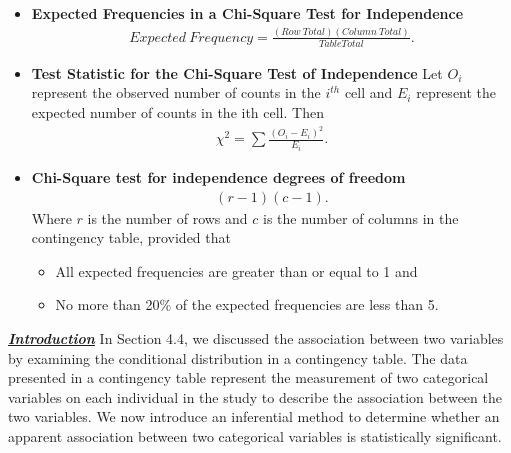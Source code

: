 \documentclass{report}
\begin{document}
    \begin{itemize}
        \item \textbf{Expected Frequencies in a Chi-Square Test for Independence}
            \begin{align*}
                Expected\ Frequency = \frac{(Row\ Total)(Column\ Total)}{Table Total} 
            .\end{align*}
        \item \textbf{Test Statistic for the Chi-Square Test of Independence}
            Let $O_{i}$ represent the observed number of counts in the $i^{th}$ cell and $E_{i}$ represent the expected number of counts in the ith cell. Then
            \begin{align*}
                \chi^{2} = \sum \frac{(O_{i} - E_{i})^{2}}{E_{i}}
            .\end{align*}
        \item \textbf{Chi-Square test for independence degrees of freedom}
            \begin{align*}
                (r-1)(c-1)
            .\end{align*}
             Where $r $ is the number of rows and $c $ is the number of columns in the contingency table, provided that
             \begin{itemize}
                 \item All expected frequencies are greater than or equal to 1 and
                 \item No more than 20\% of the expected frequencies are less than 5.
             \end{itemize}
    \end{itemize}
    \pagebreak \bigbreak \noindent 
    \textbf{\textit{\underline{Introduction}}}
    \bigbreak \noindent 
    In Section 4.4, we discussed the association between two variables by examining the conditional distribution in a contingency table. The data presented in a contingency table represent the measurement of two categorical variables on each individual in the study to describe the association between the two variables.
    \bigbreak \noindent 
    We now introduce an inferential method to determine whether an apparent association between two categorical variables is statistically significant.
\end{document}
